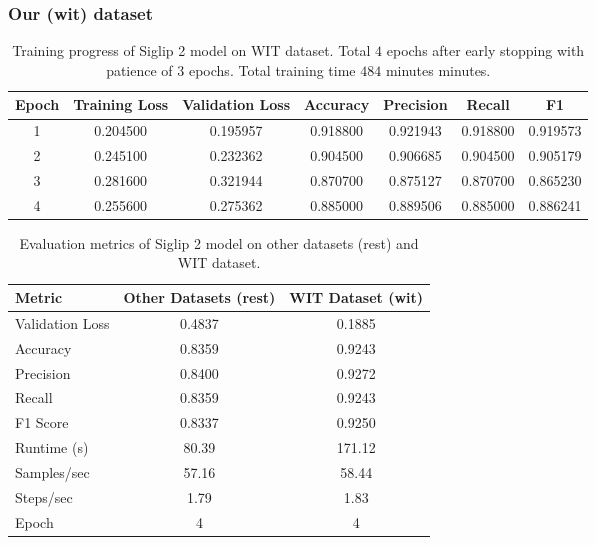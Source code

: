 \documentclass[a4paper]{article}
\begin{document}
\subsubsection{Our (wit) dataset}

\begin{table}[H]
    \centering
    \caption{Training progress of Siglip 2 model on WIT dataset. Total $4$ epochs after early stopping with patience of $3$ epochs. Total training time $484$ minutes minutes.}
    \label{tab:siglip_wit_training_progress}
    \begin{tabular}{ccccccc}
        \toprule
        \textbf{Epoch} & \textbf{Training Loss} & \textbf{Validation Loss} & \textbf{Accuracy} & \textbf{Precision} & \textbf{Recall} & \textbf{F1} \\
        \midrule
        1 & 0.204500 & 0.195957 & 0.918800 & 0.921943 & 0.918800 & 0.919573 \\
        2 & 0.245100 & 0.232362 & 0.904500 & 0.906685 & 0.904500 & 0.905179 \\
        3 & 0.281600 & 0.321944 & 0.870700 & 0.875127 & 0.870700 & 0.865230 \\
        4 & 0.255600 & 0.275362 & 0.885000 & 0.889506 & 0.885000 & 0.886241 \\
        \bottomrule
    \end{tabular}
\end{table}

\begin{table}[H]
    \centering
    \caption{Evaluation metrics of Siglip 2 model on other datasets (rest) and WIT dataset.}
    \label{tab:siglip_eval_4epochs}
    \begin{tabular}{lcc}
        \toprule
        \textbf{Metric} & \textbf{Other Datasets (rest)} & \textbf{WIT Dataset (wit)} \\
        \midrule
        Validation Loss      & 0.4837   & 0.1885 \\
        Accuracy             & 0.8359   & 0.9243 \\
        Precision            & 0.8400   & 0.9272 \\
        Recall               & 0.8359   & 0.9243 \\
        F1 Score             & 0.8337   & 0.9250 \\
        Runtime (s)          & 80.39    & 171.12 \\
        Samples/sec          & 57.16    & 58.44 \\
        Steps/sec            & 1.79     & 1.83 \\
        Epoch                & 4        & 4 \\
        \bottomrule
    \end{tabular}
\end{table}
\end{document}

